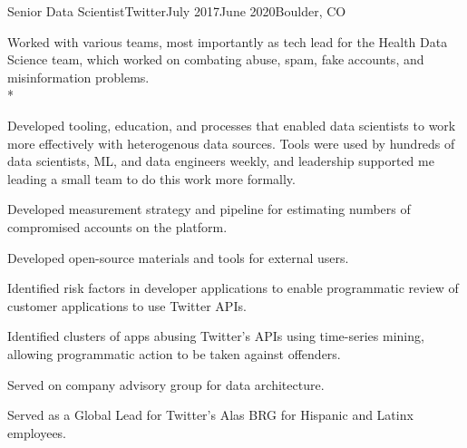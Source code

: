 \documentclass[print]{friggeri-cv} %
\begin{document}
\begin{job}
  {\twittericon}{Senior Data Scientist}{Twitter}{July 2017}{June 2020}{Boulder, CO}{
    Worked with various teams, most importantly as tech lead for the Health Data Science team,
    which worked on combating abuse, spam, fake accounts, and misinformation problems.\\*
    \begin{myitemize}
      \item Developed tooling, education, and processes that enabled data scientists to work more effectively with 
      heterogenous data sources. Tools were used by hundreds of data scientists, ML, and data engineers weekly, and leadership supported 
      me leading a small team to do this work more formally.
      \item Developed measurement strategy and pipeline for estimating numbers of compromised accounts on the platform.
      \item Developed open-source materials and tools for external users.\autocite{search_tweets_python}\autocite{do_more_with_twitter_data}
      \item Identified risk factors in developer applications to enable programmatic review of customer applications to use Twitter APIs.
      \item Identified clusters of apps abusing Twitter's APIs using time-series mining, allowing
      programmatic action to be taken against offenders.
      \item Served on company advisory group for data architecture.
      \item Served as a Global Lead for Twitter's Alas BRG for Hispanic and Latinx employees.

    \end{myitemize}
  }
\end{job}
\end{document}
